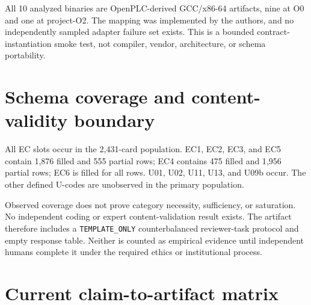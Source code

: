 \documentclass[manuscript,screen,review]{acmart}
\begin{document}
All 10 analyzed binaries are OpenPLC-derived GCC/x86-64 artifacts, nine at O0 and one at project-O2. The mapping was implemented by the authors, and no independently sampled adapter failure set exists. This is a bounded contract-instantiation smoke test, not compiler, vendor, architecture, or schema portability.

\section{Schema coverage and content-validity boundary}

All EC slots occur in the 2{,}431-card population. EC1, EC2, EC3, and EC5 contain 1{,}876 filled and 555 partial rows; EC4 contains 475 filled and 1{,}956 partial rows; EC6 is filled for all rows. U01, U02, U11, U13, and U09b occur. The other defined U-codes are unobserved in the primary population.

Observed coverage does not prove category necessity, sufficiency, or saturation. No independent coding or expert content-validation result exists. The artifact therefore includes a \texttt{TEMPLATE\_ONLY} counterbalanced reviewer-task protocol and empty response table. Neither is counted as empirical evidence until independent humans complete it under the required ethics or institutional process.

\section{Current claim-to-artifact matrix}
\end{document}
